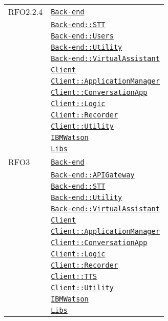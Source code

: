 \begin{longtable}{|>{\centering}m{3cm}|m{10cm}<{\centering}|}
RFO2.2.4 & \hyperref[Back-end]{\texttt{Back-end}}\\
& \hyperref[Back-end::STT]{\texttt{Back-end::STT}}\\
& \hyperref[Back-end::Users]{\texttt{Back-end::Users}}\\
& \hyperref[Back-end::Utility]{\texttt{Back-end::Utility}}\\
& \hyperref[Back-end::VirtualAssistant]{\texttt{Back-end::VirtualAssistant}}\\
& \hyperref[Client]{\texttt{Client}}\\
& \hyperref[Client::ApplicationManager]{\texttt{Client::ApplicationManager}}\\
& \hyperref[Client::ConversationApp]{\texttt{Client::ConversationApp}}\\
& \hyperref[Client::Logic]{\texttt{Client::Logic}}\\
& \hyperref[Client::Recorder]{\texttt{Client::Recorder}}\\
& \hyperref[Client::Utility]{\texttt{Client::Utility}}\\
& \hyperref[IBMWatson]{\texttt{IBMWatson}}\\
& \hyperref[Libs]{\texttt{Libs}}\\ \hline

RFO3 & \hyperref[Back-end]{\texttt{Back-end}}\\
& \hyperref[Back-end::APIGateway]{\texttt{Back-end::APIGateway}}\\
& \hyperref[Back-end::STT]{\texttt{Back-end::STT}}\\
& \hyperref[Back-end::Utility]{\texttt{Back-end::Utility}}\\
& \hyperref[Back-end::VirtualAssistant]{\texttt{Back-end::VirtualAssistant}}\\
& \hyperref[Client]{\texttt{Client}}\\
& \hyperref[Client::ApplicationManager]{\texttt{Client::ApplicationManager}}\\
& \hyperref[Client::ConversationApp]{\texttt{Client::ConversationApp}}\\
& \hyperref[Client::Logic]{\texttt{Client::Logic}}\\
& \hyperref[Client::Recorder]{\texttt{Client::Recorder}}\\
& \hyperref[Client::TTS]{\texttt{Client::TTS}}\\
& \hyperref[Client::Utility]{\texttt{Client::Utility}}\\
& \hyperref[IBMWatson]{\texttt{IBMWatson}}\\
& \hyperref[Libs]{\texttt{Libs}}\\ \hline


\end{longtable}
